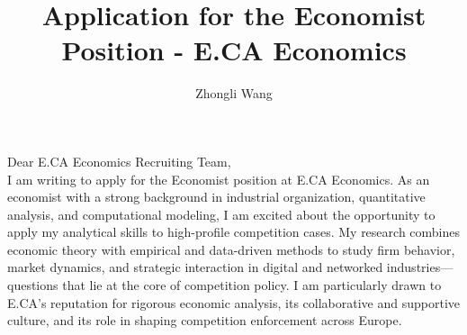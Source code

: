 \documentclass{nfr}
\title{Application for the Economist Position - E.CA Economics}
\author{Zhongli Wang}
\begin{document}

% 
% 
% 
% 


\maketitle


\noindent Dear E.CA Economics Recruiting Team,\\[0.2cm]

I am writing to apply for the Economist position at E.CA Economics. 
As an economist with a strong background in industrial organization, quantitative analysis, and computational modeling, I am excited about the opportunity to apply my analytical skills to high-profile competition cases. 
My research combines economic theory with empirical and data-driven methods to study firm behavior, market dynamics, and strategic interaction in digital and networked industries—questions that lie at the core of competition policy. 
I am particularly drawn to E.CA’s reputation for rigorous economic analysis, its collaborative and supportive culture, and its role in shaping competition enforcement across Europe.\\
\end{document}
